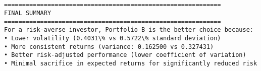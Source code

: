 \documentclass[11pt]{article}
\begin{document}
    \begin{center}
    \end{center}
    { \hspace*{\fill} \\}
    
    \begin{Verbatim}[commandchars=\\\{\}]

============================================================
FINAL SUMMARY
============================================================
For a risk-averse investor, Portfolio B is the better choice because:
• Lower volatility (0.4031\% vs 0.5722\% standard deviation)
• More consistent returns (variance: 0.162500 vs 0.327431)
• Better risk-adjusted performance (lower coefficient of variation)
• Minimal sacrifice in expected returns for significantly reduced risk
    \end{Verbatim}


    
    
    
\end{document}
